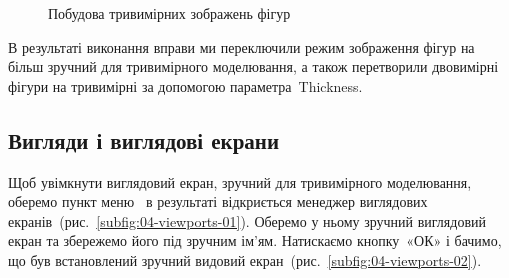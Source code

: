 \documentclass[
	a4paper,
	oneside,
	BCOR = 10mm,
	DIV = 12,
	12pt,
	headings = normal,
]{scrartcl}
\newlength{\gridunitwidth}
\begin{document}
\begin{figure}[!htbp]
\begin{subfigure}[b]{4 \gridunitwidth}
					\caption{}
					\label{subfig:03-figures-3d-hidden}
				\end{subfigure}
				\caption{Побудова тривимірних зображень фігур}
				\label{fig:03-figures-3d}
			\end{figure}

			В результаті виконання вправи ми переключили режим зображення фігур на більш зручний для тривимірного моделювання, а також перетворили двовимірні фігури на тривимірні за допомогою параметра~\textenglish{Thickness}.

		\subsection{Вигляди і виглядові екрани}
			Щоб увімкнути виглядовий екран, зручний для тривимірного моделювання, оберемо пункт меню~ в результаті відкриється менеджер виглядових екранів~(рис.~\ref{subfig:04-viewports-01}). Оберемо у ньому зручний виглядовий екран та збережемо його під зручним ім'ям. Натискаємо кнопку~«ОК» і бачимо, що був встановлений зручний видовий екран~(рис.~\ref{subfig:04-viewports-02}).
\end{document}
